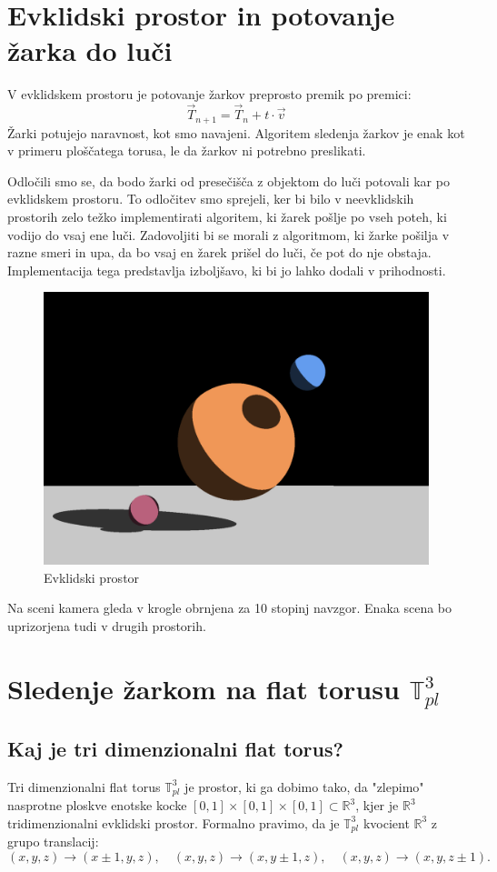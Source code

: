 \documentclass[titlepage]{article}
\begin{document}
\section{Evklidski prostor in potovanje žarka do luči}

V evklidskem prostoru je potovanje žarkov preprosto premik po premici: 
\[ \vec{T}_{n+1} = \vec{T}_{n} + t \cdot \vec{v} \]
Žarki potujejo naravnost, kot smo navajeni. Algoritem sledenja žarkov je enak 
kot v primeru ploščatega torusa, le da žarkov ni potrebno preslikati. 

Odločili smo se, da bodo žarki od presečišča z objektom do luči potovali kar po evklidskem prostoru. 
To odločitev smo sprejeli, ker bi bilo v neevklidskih prostorih zelo težko implementirati algoritem, 
ki žarek pošlje po vseh poteh, ki vodijo do vsaj ene luči. Zadovoljiti bi se morali z algoritmom,
ki žarke pošilja v razne smeri in upa, da bo vsaj en žarek prišel do luči, če pot do nje obstaja. 
Implementacija tega predstavlja izboljšavo, ki bi jo lahko dodali v prihodnosti.

\begin{figure}[H]
  \centering
  \includegraphics[width=0.8\linewidth]{Images/Euclidean_24mm.png}
  \caption{Evklidski prostor}
  \label{Slika:Euklidski prostor}
\end{figure}

Na sceni kamera gleda v krogle obrnjena za 10 stopinj navzgor. Enaka scena 
bo uprizorjena tudi v drugih prostorih.

\section{\texorpdfstring{Sledenje žarkom na flat torusu \( \mathbb{T}_{pl}^{3} \)}{Sledenje žarkom na flat torusu}}

\subsection{Kaj je tri dimenzionalni flat torus?}
Tri dimenzionalni flat torus \( \mathbb{T}^3_{pl} \) je prostor, ki ga dobimo tako, da "zlepimo" nasprotne ploskve enotske kocke \([0,1] \times [0,1] \times [0,1] \subset \mathbb{R}^3 \), kjer je \(\mathbb{R}^3\) tridimenzionalni evklidski prostor. Formalno pravimo, da je \( \mathbb{T}^3_{pl} \) kvocient \(\mathbb{R}^3\) z grupo translacij:
\[
(x, y, z) \to (x \pm 1, y, z), \quad (x, y, z) \to (x, y \pm 1, z), \quad (x, y, z) \to (x, y, z \pm 1).
\]
\end{document}
